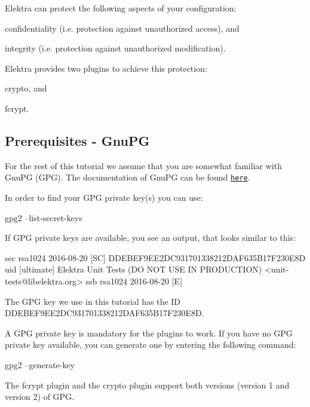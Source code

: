 Elektra can protect the following aspects of your configuration\+:


\begin{DoxyEnumerate}
\item confidentiality (i.\+e. protection against unauthorized access), and
\item integrity (i.\+e. protection against unauthorized modification).
\end{DoxyEnumerate}

Elektra provides two plugins to achieve this protection\+:


\begin{DoxyEnumerate}
\item {\ttfamily crypto}, and
\item {\ttfamily fcrypt}.
\end{DoxyEnumerate}

\subsection*{Prerequisites -\/ Gnu\+PG}

For the rest of this tutorial we assume that you are somewhat familiar with Gnu\+PG (G\+PG). The documentation of Gnu\+PG can be found \href{https://gnupg.org/documentation/index.html}{\tt here}.

In order to find your G\+PG private key(s) you can use\+: \begin{DoxyVerb}gpg2 --list-secret-keys
\end{DoxyVerb}


If G\+PG private keys are available, you see an output, that looks similar to this\+: \begin{DoxyVerb}sec   rsa1024 2016-08-20 [SC]
      DDEBEF9EE2DC931701338212DAF635B17F230E8D
uid           [ultimate] Elektra Unit Tests (DO NOT USE IN PRODUCTION) <unit-tests@libelektra.org>
ssb   rsa1024 2016-08-20 [E]
\end{DoxyVerb}


The G\+PG key we use in this tutorial has the ID {\ttfamily D\+D\+E\+B\+E\+F9\+E\+E2\+D\+C931701338212\+D\+A\+F635\+B17\+F230\+E8D}.

A G\+PG private key is mandatory for the plugins to work. If you have no G\+PG private key available, you can generate one by entering the following command\+: \begin{DoxyVerb}gpg2 --generate-key
\end{DoxyVerb}


The {\ttfamily fcrypt} plugin and the {\ttfamily crypto} plugin support both versions (version 1 and version 2) of G\+PG.

